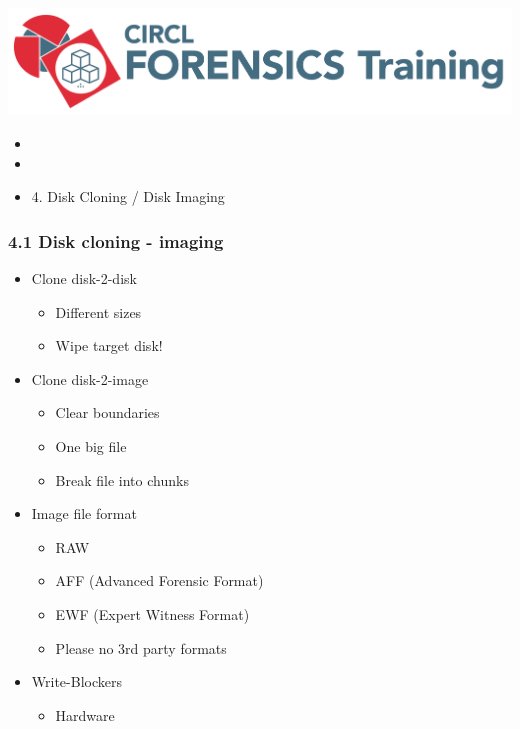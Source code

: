 %
%



\begin{frame}
    \includegraphics[scale=0.3]{images/logo-circl-Forensics.png}
    \begin{itemize}
        \item[]
        \item[]
        \item[] 4. Disk Cloning / Disk Imaging
    \end{itemize}
\end{frame}


\begin{frame}[fragile]
  \frametitle{4.1 Disk cloning - imaging}
    \begin{itemize}
        \item Clone disk-2-disk
        \begin{itemize}
            \item Different sizes
            \item Wipe target disk!
        \end{itemize}
        \item Clone disk-2-image
        \begin{itemize}
            \item Clear boundaries
            \item One big file
            \item Break file into chunks
        \end{itemize}
        \item Image file format
        \begin{itemize}
            \item RAW
            \item AFF (Advanced Forensic Format)
            \item EWF (Expert Witness Format)
            \item Please no 3rd party formats
        \end{itemize}
        \item Write-Blockers
        \begin{itemize}
            \item Hardware
        \end{itemize}
    \end{itemize}
\end{frame}


